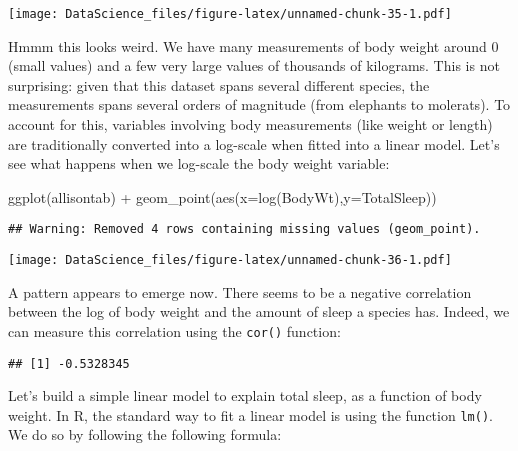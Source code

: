 \documentclass[
]{book}
\newenvironment{Shaded}{\begin{snugshade}}{\end{snugshade}}
\newcommand{\AttributeTok}[1]{\textcolor[rgb]{0.77,0.63,0.00}{#1}}
\newcommand{\FunctionTok}[1]{\textcolor[rgb]{0.00,0.00,0.00}{#1}}
\newcommand{\NormalTok}[1]{#1}
\newcommand{\SpecialCharTok}[1]{\textcolor[rgb]{0.00,0.00,0.00}{#1}}
\newcommand{\StringTok}[1]{\textcolor[rgb]{0.31,0.60,0.02}{#1}}
\begin{document}
\texttt{[image: DataScience\_files/figure-latex/unnamed-chunk-35-1.pdf]}

Hmmm this looks weird. We have many measurements of body weight around 0 (small values) and a few very large values of thousands of kilograms. This is not surprising: given that this dataset spans several different species, the measurements spans several orders of magnitude (from elephants to molerats). To account for this, variables involving body measurements (like weight or length) are traditionally converted into a log-scale when fitted into a linear model. Let's see what happens when we log-scale the body weight variable:

\begin{Shaded}
\begin{Highlighting}[]
\FunctionTok{ggplot}\NormalTok{(allisontab) }\SpecialCharTok{+} \FunctionTok{geom\_point}\NormalTok{(}\FunctionTok{aes}\NormalTok{(}\AttributeTok{x=}\FunctionTok{log}\NormalTok{(BodyWt),}\AttributeTok{y=}\NormalTok{TotalSleep))}
\end{Highlighting}
\end{Shaded}

\begin{verbatim}
## Warning: Removed 4 rows containing missing values (geom_point).
\end{verbatim}

\texttt{[image: DataScience\_files/figure-latex/unnamed-chunk-36-1.pdf]}

A pattern appears to emerge now. There seems to be a negative correlation between the log of body weight and the amount of sleep a species has. Indeed, we can measure this correlation using the \texttt{cor()} function:

\begin{Shaded}
\end{Shaded}

\begin{verbatim}
## [1] -0.5328345
\end{verbatim}

Let's build a simple linear model to explain total sleep, as a function of body weight. In R, the standard way to fit a linear model is using the function \texttt{lm()}. We do so by following the following formula:
\end{document}
